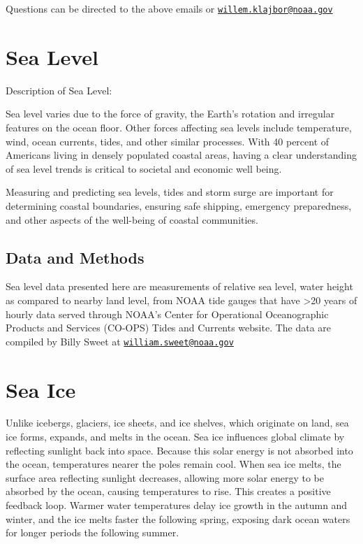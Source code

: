 \documentclass[
]{book}
\begin{document}
Questions can be directed to the above emails or \href{mailto:willem.klajbor@noaa.gov}{\nolinkurl{willem.klajbor@noaa.gov}}

\hypertarget{sea-level}{%
\chapter{Sea Level}\label{sea-level}}

Description of Sea Level:

Sea level varies due to the force of gravity, the Earth's rotation and irregular features on the ocean floor. Other forces affecting sea levels include temperature, wind, ocean currents, tides, and other similar processes. With 40 percent of Americans living in densely populated coastal areas, having a clear understanding of sea level trends is critical to societal and economic well being.

Measuring and predicting sea levels, tides and storm surge are important for determining coastal boundaries, ensuring safe shipping, emergency preparedness, and other aspects of the well-being of coastal communities.

\hypertarget{data-and-methods-1}{%
\section{Data and Methods}\label{data-and-methods-1}}

Sea level data presented here are measurements of relative sea level, water height as compared to nearby land level, from NOAA tide gauges that have \textgreater20 years of hourly data served through NOAA's Center for Operational Oceanographic Products and Services (CO-OPS) Tides and Currents website. The data are compiled by Billy Sweet at \href{mailto:william.sweet@noaa.gov}{\nolinkurl{william.sweet@noaa.gov}}

\hypertarget{sea-ice}{%
\chapter{Sea Ice}\label{sea-ice}}

Unlike icebergs, glaciers, ice sheets, and ice shelves, which originate on land, sea ice forms, expands, and melts in the ocean. Sea ice influences global climate by reflecting sunlight back into space. Because this solar energy is not absorbed into the ocean, temperatures nearer the poles remain cool. When sea ice melts, the surface area reflecting sunlight decreases, allowing more solar energy to be absorbed by the ocean, causing temperatures to rise. This creates a positive feedback loop. Warmer water temperatures delay ice growth in the autumn and winter, and the ice melts faster the following spring, exposing dark ocean waters for longer periods the following summer.
\end{document}
